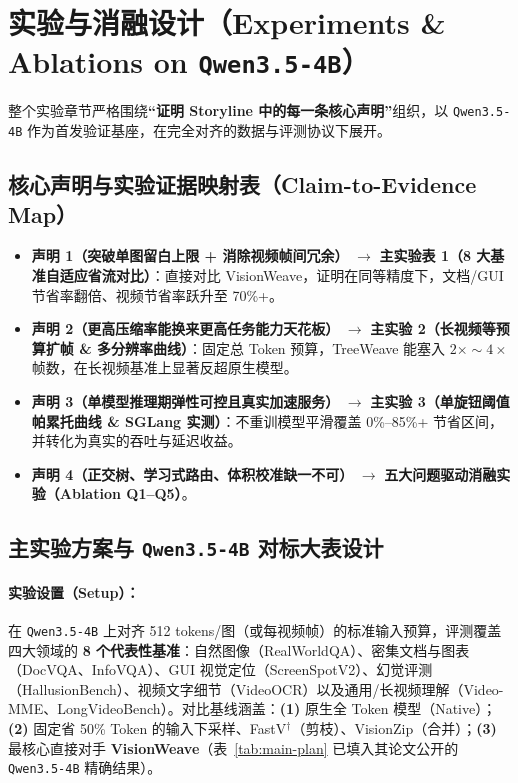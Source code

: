 \documentclass[11pt,a4paper]{ctexart}
\begin{document}
\section{实验与消融设计（Experiments \& Ablations on \texttt{Qwen3.5-4B}）}

整个实验章节严格围绕\textbf{``证明 Storyline 中的每一条核心声明''}组织，以 \texttt{Qwen3.5-4B} 作为首发验证基座，在完全对齐的数据与评测协议下展开。

\subsection{核心声明与实验证据映射表（Claim-to-Evidence Map）}

\begin{claimbox}
\begin{itemize}[leftmargin=1.4em, itemsep=3pt]
  \item \textbf{声明 1（突破单图留白上限 + 消除视频帧间冗余）} $\longrightarrow$ \textbf{主实验表 1（8 大基准自适应省流对比）}：直接对比 VisionWeave，证明在同等精度下，文档/GUI 节省率翻倍、视频节省率跃升至 70\%+。
  \item \textbf{声明 2（更高压缩率能换来更高任务能力天花板）} $\longrightarrow$ \textbf{主实验 2（长视频等预算扩帧 \& 多分辨率曲线）}：固定总 Token 预算，TreeWeave 能塞入 $2{\times}{\sim}4{\times}$ 帧数，在长视频基准上显著反超原生模型。
  \item \textbf{声明 3（单模型推理期弹性可控且真实加速服务）} $\longrightarrow$ \textbf{主实验 3（单旋钮阈值帕累托曲线 \& SGLang 实测）}：不重训模型平滑覆盖 0\%--85\%+ 节省区间，并转化为真实的吞吐与延迟收益。
  \item \textbf{声明 4（正交树、学习式路由、体积校准缺一不可）} $\longrightarrow$ \textbf{五大问题驱动消融实验（Ablation Q1--Q5）}。
\end{itemize}
\end{claimbox}

\subsection{主实验方案与 \texttt{Qwen3.5-4B} 对标大表设计}

\paragraph{实验设置（Setup）：}
在 \texttt{Qwen3.5-4B} 上对齐 512 tokens/图（或每视频帧）的标准输入预算，评测覆盖四大领域的 \textbf{8 个代表性基准}：自然图像（RealWorldQA）、密集文档与图表（DocVQA、InfoVQA）、GUI 视觉定位（ScreenSpotV2）、幻觉评测（HallusionBench）、视频文字细节（VideoOCR）以及通用/长视频理解（Video-MME、LongVideoBench）。对比基线涵盖：\textbf{(1)} 原生全 Token 模型（Native）；\textbf{(2)} 固定省 50\% Token 的输入下采样、FastV$^\dagger$（剪枝）、VisionZip（合并）；\textbf{(3)} 最核心直接对手 \textbf{VisionWeave}（表~\ref{tab:main-plan} 已填入其论文公开的 \texttt{Qwen3.5-4B} 精确结果）。
\end{document}
